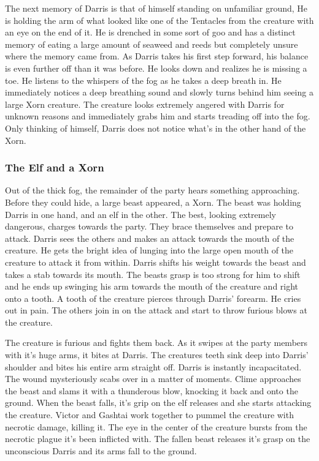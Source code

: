 The next memory of Darris is that of himself standing on unfamiliar ground, He is holding the arm of what looked like one of the Tentacles from the creature with an eye on the end of it. He is drenched in some sort of goo and has a distinct memory of eating a large amount of seaweed and reeds but completely unsure where the memory came from. As Darris takes his first step forward, his balance is even further off than it was before. He looks down and realizes he is missing a toe. He listens to the whispers of the fog as he takes a deep breath in. He immediately notices a deep breathing sound and slowly turns behind him seeing a large Xorn creature. The creature looks extremely angered with Darris for unknown reasons and immediately grabs him and starts treading off into the fog. Only thinking of himself, Darris does not notice what's in the other hand of the Xorn.

\subsubsection{The Elf and a Xorn}

Out of the thick fog, the remainder of the party hears something approaching. Before they could hide, a large beast appeared, a Xorn. The beast was holding Darris in one hand, and an elf in the other. The best, looking extremely dangerous, charges towards the party. They brace themselves and prepare to attack. Darris sees the others and makes an attack towards the mouth of the creature. He gets the bright idea of lunging into the large open mouth of the creature to attack it from within. Darris shifts his weight towards the beast and takes a stab towards its mouth. The beasts grasp is too strong for him to shift and he ends up swinging his arm towards the mouth of the creature and right onto a tooth. A tooth of the creature pierces through Darris' forearm. He cries out in pain. The others join in on the attack and start to throw furious blows at the creature.

The creature is furious and fights them back. As it swipes at the party members with it's huge arms, it bites at Darris. The creatures teeth sink deep into Darris' shoulder and bites his entire arm straight off. Darris is instantly incapacitated. The wound mysteriously scabs over in a matter of moments. Clime approaches the beast and slams it with a thunderous blow, knocking it back and onto the ground. When the beast falls, it's grip on the elf releases and she starts attacking the creature. Victor and Gashtai work together to pummel the creature with necrotic damage, killing it. The eye in the center of the creature bursts from the necrotic plague it's been inflicted with. The fallen beast releases it's grasp on the unconscious Darris and its arms fall to the ground. 

